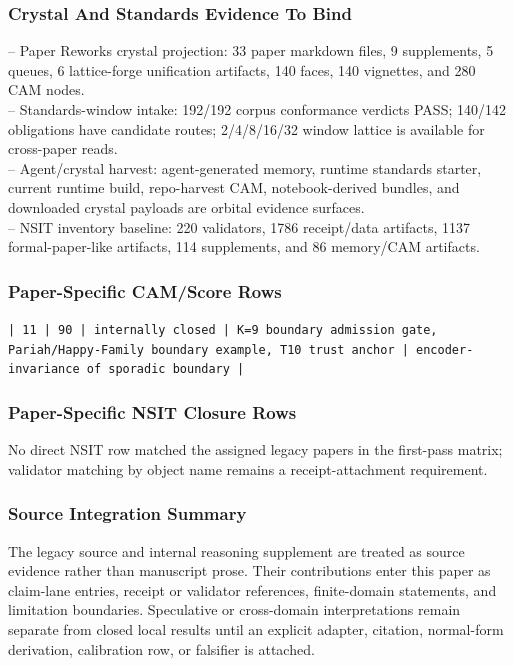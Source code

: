 \documentclass[11pt]{article}
\begin{document}
\subsubsection*{Crystal And Standards Evidence To Bind}

\noindent{}-- Paper Reworks crystal projection: 33 paper markdown files, 9 supplements, 5 queues, 6 lattice-forge unification artifacts, 140 faces, 140 vignettes, and 280 CAM nodes.\\
\noindent{}-- Standards-window intake: 192/192 corpus conformance verdicts PASS; 140/142 obligations have candidate routes; 2/4/8/16/32 window lattice is available for cross-paper reads.\\
\noindent{}-- Agent/crystal harvest: agent-generated memory, runtime standards starter, current runtime build, repo-harvest CAM, notebook-derived bundles, and downloaded crystal payloads are orbital evidence surfaces.\\
\noindent{}-- NSIT inventory baseline: 220 validators, 1786 receipt/data artifacts, 1137 formal-paper-like artifacts, 114 supplements, and 86 memory/CAM artifacts.\\

\subsubsection*{Paper-Specific CAM/Score Rows}

\noindent\texttt{| 11 | 90 | internally closed | K=9 boundary admission gate, Pariah/Happy-Family boundary example, T10 trust anchor | encoder-invariance of sporadic boundary |}\\

\subsubsection*{Paper-Specific NSIT Closure Rows}

No direct NSIT row matched the assigned legacy papers in the first-pass matrix; validator matching by object name remains a receipt-attachment requirement.

\subsubsection*{Source Integration Summary}

The legacy source and internal reasoning supplement are treated as source
evidence rather than manuscript prose. Their contributions enter this paper as
claim-lane entries, receipt or validator references, finite-domain statements,
and limitation boundaries. Speculative or cross-domain interpretations remain
separate from closed local results until an explicit adapter, citation,
normal-form derivation, calibration row, or falsifier is attached.
\end{document}

